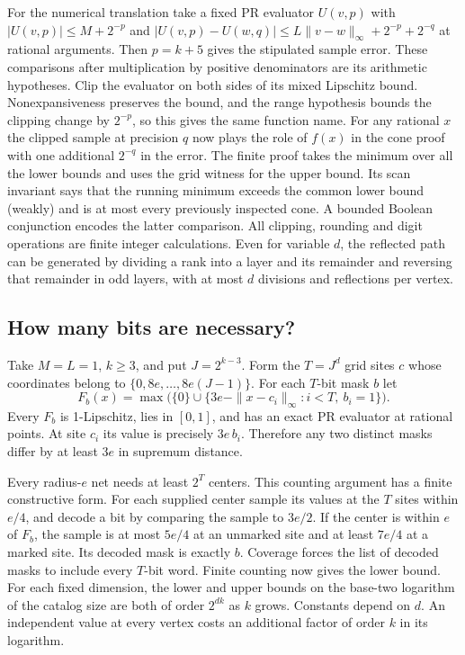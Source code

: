 For the numerical translation take a fixed PR evaluator $U(v,p)$ with
$|U(v,p)|\le M+2^{-p}$ and
$|U(v,p)-U(w,q)|\le L\|v-w\|_\infty+2^{-p}+2^{-q}$ at rational arguments. Then $p=k+5$ gives the stipulated sample error. These comparisons after multiplication by positive denominators are its arithmetic hypotheses. Clip the evaluator on both sides of its mixed Lipschitz bound. Nonexpansiveness preserves the bound, and the range hypothesis bounds the clipping change by $2^{-p}$, so this gives the same function name. For any rational $x$ the clipped sample at precision $q$ now plays the role of $f(x)$ in the cone proof with one additional $2^{-q}$ in the error. The finite proof takes the minimum over all the lower bounds and uses the grid witness for the upper bound. Its scan invariant says that the running minimum exceeds the common lower bound (weakly) and is at most every previously inspected cone. A bounded Boolean conjunction encodes the latter comparison. All clipping, rounding and digit operations are finite integer calculations. Even for variable $d$, the reflected path can be generated by dividing a rank into a layer and its remainder and reversing that remainder in odd layers, with at most $d$ divisions and reflections per vertex.

\subsection{How many bits are necessary?}

Take $M=L=1$, $k\ge3$, and put $J=2^{k-3}$. Form the $T=J^d$ grid sites $c$ whose coordinates belong to $\{0,8e,\ldots,8e(J-1)\}$. For each $T$-bit mask $b$ let
\[
 F_b(x)=\max\bigl(\{0\}\cup
       \{3e-\|x-c_i\|_\infty: i<T,\ b_i=1\}\bigr).
\]
Every $F_b$ is 1-Lipschitz, lies in $[0,1]$, and has an exact PR evaluator at rational points. At site $c_i$ its value is precisely $3e\,b_i$. Therefore any two distinct masks differ by at least $3e$ in supremum distance.

Every radius-$e$ net needs at least $2^T$ centers. This counting argument has a finite constructive form. For each supplied center sample its values at the $T$ sites within $e/4$, and decode a bit by comparing the sample to $3e/2$. If the center is within $e$ of $F_b$, the sample is at most $5e/4$ at an unmarked site and at least $7e/4$ at a marked site. Its decoded mask is exactly $b$. Coverage forces the list of decoded masks to include every $T$-bit word. Finite counting now gives the lower bound. For each fixed dimension, the lower and upper bounds on the base-two logarithm of the catalog size are both of order $2^{dk}$ as $k$ grows. Constants depend on $d$. An independent value at every vertex costs an additional factor of order $k$ in its logarithm.

